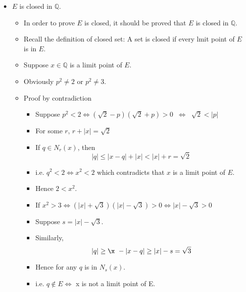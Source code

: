 \documentclass[12pt]{article}
\begin{document}
\begin{itemize}
    \item $E$ is closed in $\mathbb{Q}$.
        \begin{itemize}
            \item In order to prove $E$ is closed, it should be proved that $E$ is closed in $\mathbb{Q}$. 
            \item Recall the definition of closed set: A set is closed if every lmit point of $E$ is in $E$. 
            \item Suppose $x \in \mathbb{Q}$ is a limit point of $E$.
            \item Obviously $p^2 \neq 2$ or $p^2 \neq 3$.\\
            
            \item Proof by contradiction
                \begin{itemize}
                    \item Suppose $p^2 < 2 \Leftrightarrow (\sqrt{2}-p)(\sqrt{2}+p) > 0\;\;\Leftrightarrow\;\; \sqrt{2} < |p|$
                    \item For some $r$, $r + |x| = \sqrt{2}$
                    \item If $q \in N_r(x)$, then
                    $$
                    |q| \le |x-q| + |x| < |x| + r = \sqrt{2}
                    $$
                    \item i.e. $q^2 < 2 \Leftrightarrow x^2 < 2$ which contradicts that $x$ is a limit point of $E$.
                    \item Hence $2 < x^2$.\\
            
                    \item If $x^2 > 3 \Leftrightarrow (|x| + \sqrt{3})(|x| - \sqrt{3}) > 0 \Leftrightarrow |x| - \sqrt{3} > 0 $  
                    \item Suppose $s = |x| - \sqrt{3}$.
                    \item Similarly,
                    $$
                    |q| \ge \x\ - |x-q| \ge |x| - s = \sqrt{3}
                    $$
                    \item Hence for any $q$ is in $N_s(x)$. 
                    \item i.e. $q \notin E \Leftrightarrow$ x is not a limit point of E.\\
                \end{itemize}
                

\end{itemize}
\end{itemize}
\end{document}
